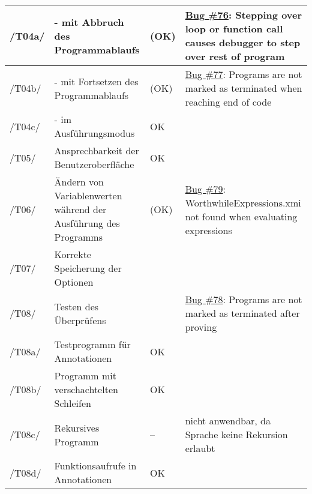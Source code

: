 \begin{landscape}
\begin{longtable}{lp{8cm}lp{10cm}}
/T04a/ &  - mit Abbruch des Programmablaufs & (OK) & \href{https://github.com/team-worthwhile/worthwhile/issues/76}{Bug \#76}: Stepping over loop or function call causes debugger to step over rest of program \\ \midrule
/T04b/ &  - mit Fortsetzen des Programmablaufs & (OK) & \href{https://github.com/team-worthwhile/worthwhile/issues/77}{Bug \#77}: Programs are not marked as terminated when reaching end of code \\ \midrule
/T04c/ &  - im Ausführungsmodus & OK &  \\ \midrule
\midrule
/T05/ & Ansprechbarkeit der Benutzeroberfläche & OK &  \\ \midrule
\midrule
/T06/ & Ändern von Variablenwerten während der Ausführung des Programms & (OK) & \href{https://github.com/team-worthwhile/worthwhile/issues/79}{Bug \#79}: WorthwhileExpressions.xmi not found when evaluating expressions \\ \midrule
\midrule
/T07/ & Korrekte Speicherung der Optionen &  &  \\ \midrule
\midrule
/T08/ & Testen des Überprüfens & & \href{https://github.com/team-worthwhile/worthwhile/issues/78}{Bug \#78}: Programs are not marked as terminated after proving \\ \midrule
/T08a/ & Testprogramm für Annotationen & OK &  \\ \midrule
/T08b/ & Programm mit verschachtelten Schleifen & OK &  \\ \midrule
/T08c/ & Rekursives Programm & -- & nicht anwendbar, da Sprache keine Rekursion erlaubt \\ \midrule
/T08d/ & Funktionsaufrufe in Annotationen & OK &  \\

\bottomrule
\bottomrule
\end{longtable}

\end{landscape}